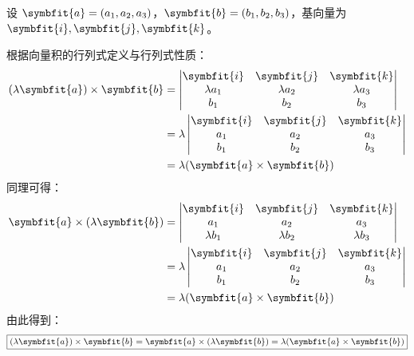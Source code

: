 \begin{myproof}
    设 $\symbfit{a} = (a_1, a_2, a_3)$，$\symbfit{b} = (b_1, b_2, b_3)$，基向量为 $\symbfit{i}, \symbfit{j}, \symbfit{k}$。


    根据向量积的行列式定义与行列式性质：
    \begin{equation}
        \begin{aligned}
            (\lambda\symbfit{a}) \times \symbfit{b} & = \begin{vmatrix} \symbfit{i} & \symbfit{j} & \symbfit{k} \\ \lambda a_1 & \lambda a_2 & \lambda a_3 \\ b_1 & b_2 & b_3 \end{vmatrix} \\
                                                    & = \lambda \begin{vmatrix} \symbfit{i} & \symbfit{j} & \symbfit{k} \\ a_1 & a_2 & a_3 \\ b_1 & b_2 & b_3 \end{vmatrix}                 \\
                                                    & = \lambda(\symbfit{a} \times \symbfit{b})
        \end{aligned}
    \end{equation}
    同理可得：
    \begin{equation}
        \begin{aligned}
            \symbfit{a} \times (\lambda\symbfit{b}) & = \begin{vmatrix} \symbfit{i} & \symbfit{j} & \symbfit{k} \\ a_1 & a_2 & a_3 \\ \lambda b_1 & \lambda b_2 & \lambda b_3 \end{vmatrix} \\
                                                    & = \lambda \begin{vmatrix} \symbfit{i} & \symbfit{j} & \symbfit{k} \\ a_1 & a_2 & a_3 \\ b_1 & b_2 & b_3 \end{vmatrix}                 \\
                                                    & = \lambda(\symbfit{a} \times \symbfit{b})
        \end{aligned}
    \end{equation}
    由此得到：
    \begin{equation}
        \boxed{(\lambda\symbfit{a}) \times \symbfit{b} = \symbfit{a} \times (\lambda\symbfit{b}) = \lambda(\symbfit{a} \times \symbfit{b})}
    \end{equation}


\end{myproof}
